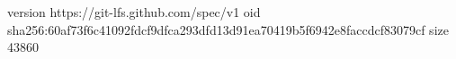 version https://git-lfs.github.com/spec/v1
oid sha256:60af73f6c41092fdcf9dfca293dfd13d91ea70419b5f6942e8faccdcf83079cf
size 43860
